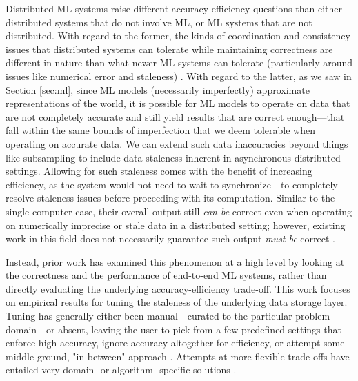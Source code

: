 \documentclass[sigplan,screen]{acmart}
\begin{document}
Distributed ML systems raise different accuracy-efficiency questions than either distributed systems that do not involve ML, or ML systems that are not distributed. With regard to the former, the kinds of coordination and consistency issues that distributed systems can tolerate while maintaining correctness are different in nature than what newer ML systems can tolerate (particularly around issues like numerical error and staleness) \cite{bailis2012pbs, DeCandia2007dynamo,Yu2000numerical}. With regard to the latter, as we saw in Section \ref{sec:ml}, since ML models (necessarily imperfectly) approximate representations of the world, it is possible for ML models to operate on data that are not completely accurate and still yield results that are correct enough---that fall within the same bounds of imperfection that we deem tolerable when operating on accurate data. We can extend such data inaccuracies beyond things like subsampling to include data staleness inherent in asynchronous distributed settings. Allowing for such staleness comes with the benefit of increasing efficiency, as the system would not need to wait to synchronize---to completely resolve staleness issues before proceeding with its computation. Similar to the single computer case, their overall output still \emph{can be} correct even when operating on numerically imprecise or stale data in a distributed setting; however, existing work in this field does not necessarily guarantee such output \emph{must be} correct \cite{alistarh2018convergence,dutta2018slow, gong2014quantize, lian2017asynchronous, Niu2011hogwild, desa2015taming, zhang2015sgdstaleness}.

Instead, prior work has examined this phenomenon at a high level by looking at the correctness and the performance of end-to-end ML systems, rather than directly evaluating the underlying accuracy-efficiency trade-off. This work focuses on empirical results for tuning the staleness of the underlying data storage layer. Tuning has generally either been manual---curated to the particular problem domain---or absent, leaving the user to pick from a few predefined settings that enforce high accuracy, ignore accuracy altogether for efficiency, or attempt some middle-ground, "in-between" approach \cite{Abadi2016tf, ho2013SSPParameterServer, Li2014parameterserver, kosaian2019paritymodels, pan2016cyclades}. Attempts at more flexible trade-offs have entailed very domain- or algorithm- specific solutions \cite{Lloyd2011COP, pan2013occ, Wei2015managed}.
\end{document}
